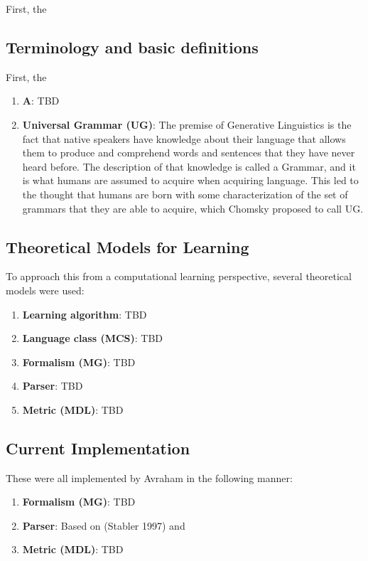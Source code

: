 \documentclass{article}
\begin{document}
First, the 

\subsection{Terminology and basic definitions} %
First, the 
\begin{enumerate}
  \item \textbf{A}: TBD
  \item \textbf{Universal Grammar (UG)}: The premise of Generative Linguistics is the fact that native speakers have knowledge about
their language that allows them to produce and comprehend words and sentences that they have never heard before. The description of that knowledge is called a Grammar, and it is what humans are assumed to acquire when acquiring language. This led to the thought that humans are born with some characterization of the set of grammars that they are able to acquire,  which Chomsky proposed to call UG.
\end{enumerate}

\subsection{Theoretical Models for Learning} %
To approach this from a computational learning perspective, several theoretical models were used:
\begin{enumerate}
  \item \textbf{Learning algorithm}: TBD
  \item \textbf{Language class (MCS)}: TBD
  \item \textbf{Formalism (MG)}: TBD
  \item \textbf{Parser}: TBD
  \item \textbf{Metric (MDL)}: TBD
\end{enumerate}

\subsection{Current Implementation} 
These were all implemented by Avraham in the following manner:
\begin{enumerate}
  \item \textbf{Formalism (MG)}: TBD
  \item \textbf{Parser}: Based on (Stabler 1997) and 
  \item \textbf{Metric (MDL)}: TBD
\end{enumerate}
\end{document}
